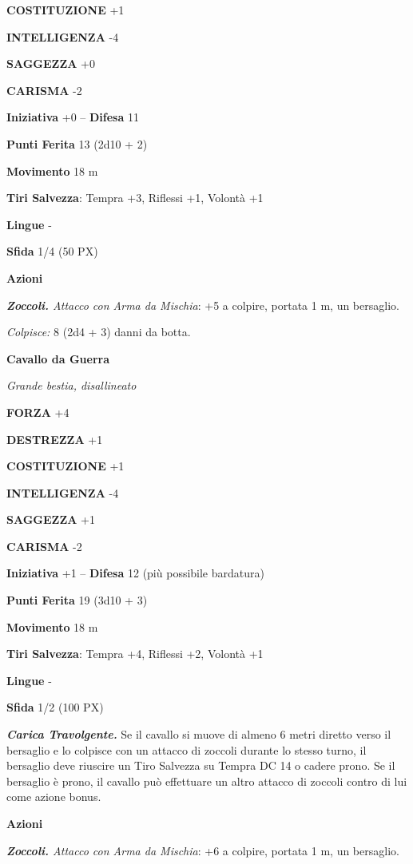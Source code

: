 \begin{multicols}{2}
	\textbf{COSTITUZIONE} +1

	\textbf{INTELLIGENZA} -4

	\textbf{SAGGEZZA} +0

	\textbf{CARISMA} -2

	\textbf{Iniziativa} +0 -- \textbf{Difesa} 11

	\textbf{Punti Ferita} 13 (2d10 + 2)

	\textbf{Movimento} 18 m

	\textbf{Tiri Salvezza}: Tempra +3, Riflessi +1, Volontà +1

	\textbf{Lingue} -

	\textbf{Sfida} 1/4 (50 PX)

	\textbf{Azioni}

	\textit{\textbf{Zoccoli.} Attacco con Arma da Mischia}: +5 a colpire, portata 1 m, un bersaglio.

	\textit{Colpisce:} 8 (2d4 + 3) danni da botta.

	\medskip\textbf{Cavallo da Guerra}

	\textit{Grande bestia, disallineato}

	\textbf{FORZA} +4

	\textbf{DESTREZZA} +1

	\textbf{COSTITUZIONE} +1

	\textbf{INTELLIGENZA} -4

	\textbf{SAGGEZZA} +1

	\textbf{CARISMA} -2

	\textbf{Iniziativa} +1 -- \textbf{Difesa} 12 (più possibile bardatura)

	\textbf{Punti Ferita} 19 (3d10 + 3)

	\textbf{Movimento} 18 m

	\textbf{Tiri Salvezza}: Tempra +4, Riflessi +2, Volontà +1

	\textbf{Lingue} -

	\textbf{Sfida} 1/2 (100 PX)

	\textit{\textbf{Carica Travolgente.}} Se il cavallo si muove di almeno 6 metri diretto verso il bersaglio e lo colpisce con un attacco di zoccoli durante lo stesso turno, il bersaglio deve riuscire un Tiro Salvezza su Tempra DC 14 o cadere prono. Se il bersaglio è prono, il cavallo può effettuare un altro attacco di zoccoli contro di lui come azione bonus.

	\textbf{Azioni}

	\textit{\textbf{Zoccoli.} Attacco con Arma da Mischia}: +6 a colpire, portata 1 m, un bersaglio.


\end{multicols}
